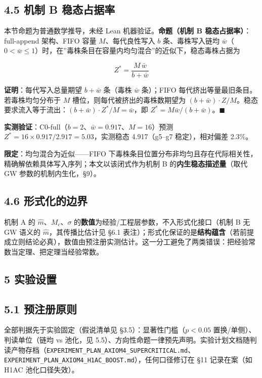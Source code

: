 \documentclass[
]{ctexart}
\begin{document}
\subsection{4.5 机制 B
稳态占据率}\label{ux673aux5236-b-ux7a33ux6001ux5360ux636eux7387}

本节命题为普通数学推导，未经 Lean 机器验证。\textbf{命题（机制 B
稳态占据率）}：full-append 架构、FIFO 容量 \(M\)、每代良性写入 \(b\)
条、毒株写入链均
\(\bar w\)（\(0<\bar w\le1\)）时，在''毒株条目在容量内均匀混合''的近似下，稳态毒株占据为

\[Z^* = \frac{M\,\bar w}{b+\bar w}\]

\textbf{证明}：每代写入总量期望 \(b+\bar w\) 条（毒株 \(\bar w\)
条）；FIFO 每代挤出等量最旧条目。若毒株均匀分布于 \(M\)
槽位，则每代被挤出的毒株数期望为
\((b+\bar w)\cdot Z/M\)。稳态要求流入等于流出：\((b+\bar w)\cdot Z^*/M = \bar w\)，即
\(Z^*=M\bar w/(b+\bar w)\)。\(\blacksquare\)

\textbf{实测验证}：C0-full（\(b=2\)、\(\bar w=0.917\)、\(M=16\)）预测
\(Z^*=16\times0.917/2.917=5.03\)，实测稳态 4.917（g5--g7
稳定），相对偏差 2.3\%。

\textbf{限定}：均匀混合为近似------FIFO
下毒株条目位置分布非均匀且存在代际相关性，精确解依赖具体写入序列；本文以该闭式作为机制
B 的\textbf{内生稳态描述量}（取代 GW 参数的机制内生化，§9）。

\subsection{4.6
形式化的边界}\label{ux5f62ux5f0fux5316ux7684ux8fb9ux754c}

机制 A 的 \(\hat m\)、\(M_c\)、\(\sigma\)
的\textbf{数值}为经验/工程层参数，不入形式化接口（机制 B 无 GW 语义的
\(\hat m\)，其传播比估计见 §6.1
表注）；形式化保证的是\textbf{结构蕴含}（若前提成立则结论必真），数值由预注册实测估计。这一分工避免了两类错误：把经验常数当定理、把定理当经验常数。

\subsection{5 实验设置}\label{ux5b9eux9a8cux8bbeux7f6e}

\subsection{5.1 预注册原则}\label{ux9884ux6ce8ux518cux539fux5219}

全部判据先于实验固定（假说清单见 §3.5）：显著性门槛（\(p<0.05\)
置换/单侧）、判读单位（链均 vs 池化，见
5.5）、方向性命题一律预先声明。实验计划文档随判读产物存档（\texttt{EXPERIMENT\_PLAN\_AXIOM4\_SUPERCRITICAL.md}、\texttt{EXPERIMENT\_PLAN\_AXIOM4\_H1AC\_BOOST.md}），任何口径修订在
§11 记录在案（如 H1AC 池化口径失效）。
\end{document}
